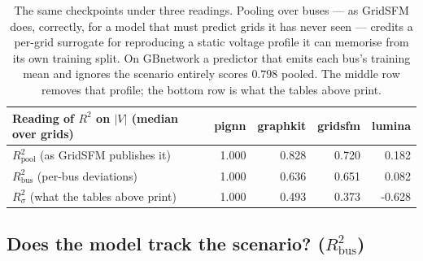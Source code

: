 \documentclass[10pt]{article}
\begin{document}
\begin{table}[H]
\centering\small
\begin{tabular}{lrrrr}
\toprule
Reading of $R^2$ on $|V|$ (median over grids) & pignn & graphkit & gridsfm & lumina\\
\midrule
$R^2_{\mathrm{pool}}$ (as GridSFM publishes it) & 1.000 & 0.828 & 0.720 & 0.182 \\
$R^2_{\mathrm{bus}}$ (per-bus deviations) & 1.000 & 0.636 & 0.651 & 0.082 \\
$R^2_{\sigma}$ (what the tables above print) & 1.000 & 0.493 & 0.373 & -0.628 \\
\bottomrule
\end{tabular}
\caption{The same checkpoints under three readings.  Pooling over buses --- as
GridSFM does, correctly, for a model that must predict grids it has never seen
--- credits a per-grid surrogate for reproducing a static voltage profile it
can memorise from its own training split.  On GBnetwork a predictor that emits
each bus's training mean and ignores the scenario entirely scores $0.798$
pooled.  The middle row removes that profile; the bottom row is what the tables
above print.}
\end{table}

\subsection*{Does the model track the scenario? ($R^2_{\mathrm{bus}}$)}
\end{document}
